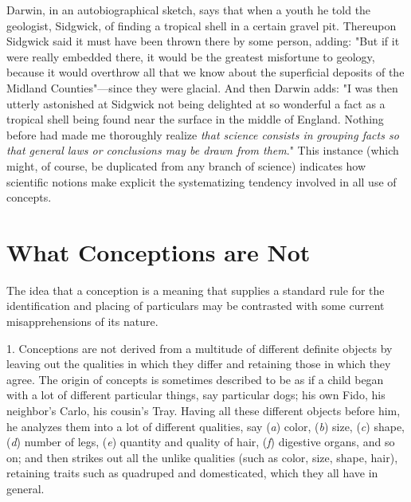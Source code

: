\documentclass[letterpaper]{book}
\begin{document}

Darwin, in an autobiographical sketch, says that when a youth he told
the geologist, Sidgwick, of finding a tropical shell in a certain gravel
pit. Thereupon Sidgwick said it must have been thrown there by some
person, adding: "But if it were really embedded there, it would be the
greatest misfortune to geology, because it would overthrow all that we
know about the superficial deposits of the Midland Counties"---since
they were glacial. And then Darwin adds: "I was then utterly astonished
at Sidgwick not being delighted at so wonderful a fact as a tropical
shell being found near the surface in the middle of England. Nothing
before had made me thoroughly realize \emph{that science consists in
grouping facts so that general laws or conclusions may be drawn from
them}." This instance (which might, of course, be duplicated from any
branch of science) indicates how scientific notions make explicit the
systematizing tendency involved in all use of concepts.

\section{What Conceptions are Not}

The idea that a conception is a meaning that supplies a standard rule
for the identification and placing of particulars may be contrasted with
some current misapprehensions of its nature.


1. Conceptions are not derived from a multitude
of
different definite objects by leaving out the qualities in which they
differ and retaining those in which they agree. The origin of concepts
is sometimes described to be as if a child began with a lot of different
particular things, say particular dogs; his own Fido, his neighbor's
Carlo, his cousin's Tray. Having all these different objects before him,
he analyzes them into a lot of different qualities, say (\emph{a})
color, (\emph{b}) size, (\emph{c}) shape, (\emph{d}) number of legs,
(\emph{e}) quantity and quality of hair, (\emph{f}) digestive organs,
and so on; and then strikes out all the unlike qualities (such as color,
size, shape, hair), retaining traits such as quadruped and domesticated,
which they all have in general.

\end{document}
